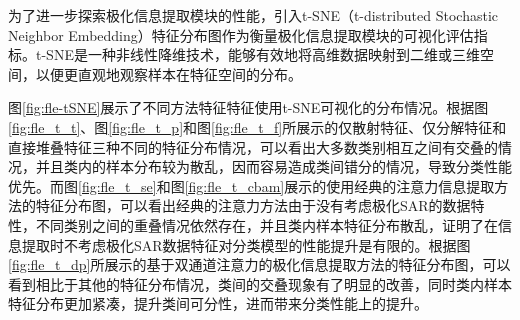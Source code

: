 为了进一步探索极化信息提取模块的性能，引入t-SNE（t-distributed Stochastic Neighbor Embedding）\citing{}特征分布图作为衡量极化信息提取模块的可视化评估指标。t-SNE是一种非线性降维技术，能够有效地将高维数据映射到二维或三维空间，以便更直观地观察样本在特征空间的分布。

图\ref{fig:fle-tSNE}展示了不同方法特征特征使用t-SNE可视化的分布情况。根据图\ref{fig:fle_t_t}、图\ref{fig:fle_t_p}和图\ref{fig:fle_t_f}所展示的仅散射特征、仅分解特征和直接堆叠特征三种不同的特征分布情况，可以看出大多数类别相互之间有交叠的情况，并且类内的样本分布较为散乱，因而容易造成类间错分的情况，导致分类性能优先。而图\ref{fig:fle_t_se}和图\ref{fig:fle_t_cbam}展示的使用经典的注意力信息提取方法的特征分布图，可以看出经典的注意力方法由于没有考虑极化SAR的数据特性，不同类别之间的重叠情况依然存在，并且类内样本特征分布散乱，证明了在信息提取时不考虑极化SAR数据特征对分类模型的性能提升是有限的。根据图\ref{fig:fle_t_dp}所展示的基于双通道注意力的极化信息提取方法的特征分布图，可以看到相比于其他的特征分布情况，类间的交叠现象有了明显的改善，同时类内样本特征分布更加紧凑，提升类间可分性，进而带来分类性能上的提升。


